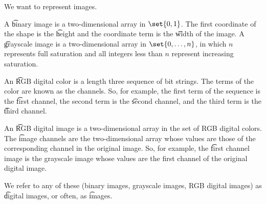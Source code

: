 

We want to represent images.


A \t{binary image} is a two-dimensional array in $\set{0, 1}$.
The first coordinate of the shape is the \t{height} and the coordinate term is the \t{width} of the image.
A \t{grayscale image} is a two-dimensional array in $\set{0, \dots, n}$, in which $n$ represents full saturation and all integers less than $n$ represent increasing saturation.

An \t{RGB digital color} is a length three sequence of bit strings.
The terms of the color are known as the channels.
So, for example, the first term of the sequence is the \t{first channel}, the second term is the \t{second channel}, and the third term is the \t{third channel}.

An \t{RGB digital image} is a two-dimensional array in the set of RGB digital colors.
The \t{image channels} are the two-dimensional array whose values are those of the corresponding channel in the original image.
So, for example, the \t{first channel image} is the grayscale image whose values are the first channel of the original digital image.

We refer to any of these (binary images, grayscale images, RGB digital images) as \t{digital images}, or often, as \t{images}.

\blankpage
